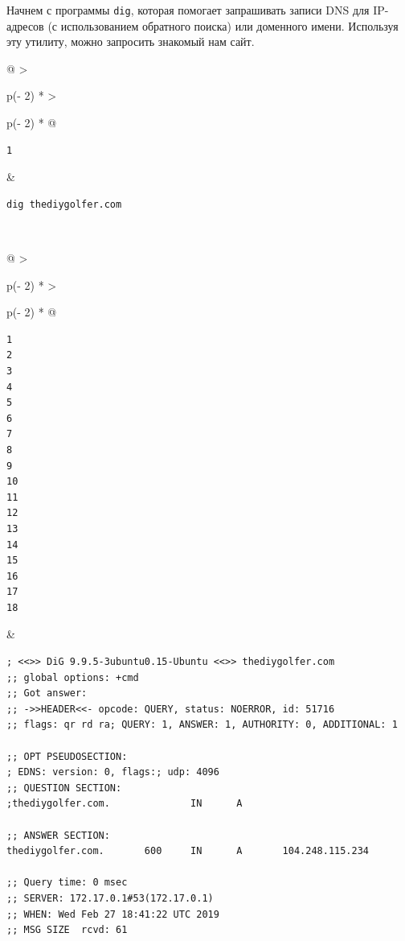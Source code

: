 \documentclass{article}
\begin{document}
Начнем с программы \texttt{dig}, которая помогает запрашивать записи DNS
для IP-адресов (с использованием обратного поиска) или доменного имени.
Используя эту утилиту, можно запросить знакомый нам сайт.

\begin{longtable}[]{@{}
  >{\raggedright\arraybackslash}p{(\columnwidth - 2\tabcolsep) * }
  >{\raggedright\arraybackslash}p{(\columnwidth - 2\tabcolsep) * }@{}}
\toprule
\endhead
\begin{minipage}[t]{\linewidth}\raggedright
\begin{verbatim}
1
\end{verbatim}
\end{minipage} & \begin{minipage}[t]{\linewidth}\raggedright
\begin{verbatim}
dig thediygolfer.com
\end{verbatim}
\end{minipage} \\ \addlinespace
\bottomrule
\end{longtable}

\begin{longtable}[]{@{}
  >{\raggedright\arraybackslash}p{(\columnwidth - 2\tabcolsep) * }
  >{\raggedright\arraybackslash}p{(\columnwidth - 2\tabcolsep) * }@{}}
\toprule
\endhead
\begin{minipage}[t]{\linewidth}\raggedright
\begin{verbatim}
1
2
3
4
5
6
7
8
9
10
11
12
13
14
15
16
17
18
\end{verbatim}
\end{minipage} & \begin{minipage}[t]{\linewidth}\raggedright
\begin{verbatim}
; <<>> DiG 9.9.5-3ubuntu0.15-Ubuntu <<>> thediygolfer.com
;; global options: +cmd
;; Got answer:
;; ->>HEADER<<- opcode: QUERY, status: NOERROR, id: 51716
;; flags: qr rd ra; QUERY: 1, ANSWER: 1, AUTHORITY: 0, ADDITIONAL: 1

;; OPT PSEUDOSECTION:
; EDNS: version: 0, flags:; udp: 4096
;; QUESTION SECTION:
;thediygolfer.com.              IN      A

;; ANSWER SECTION:
thediygolfer.com.       600     IN      A       104.248.115.234

;; Query time: 0 msec
;; SERVER: 172.17.0.1#53(172.17.0.1)
;; WHEN: Wed Feb 27 18:41:22 UTC 2019
;; MSG SIZE  rcvd: 61
\end{verbatim}
\end{minipage} \\ \addlinespace
\bottomrule
\end{longtable}
\end{document}
